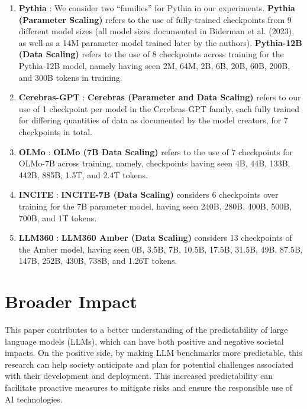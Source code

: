 \begin{enumerate}
    \item \textbf{Pythia} \citep{biderman2023pythia}: We consider two ``families'' for Pythia in our experiments. \textbf{Pythia (Parameter Scaling)} refers to the use of fully-trained checkpoints from 9 different model sizes (all model sizes documented in Biderman et al. (2023), as well as a 14M parameter model trained later by the authors). \textbf{Pythia-12B (Data Scaling)} refers to the use of 8 checkpoints across training for the Pythia-12B model, namely having seen 2M, 64M, 2B, 6B, 20B, 60B, 200B, and 300B tokens in training.
    \item \textbf{Cerebras-GPT} \citep{dey2023cerebrasgpt}: \textbf{Cerebras (Parameter and Data Scaling)} refers to our use of 1 checkpoint per model in the Cerebras-GPT family, each fully trained for differing quantities of data as documented by the model creators, for 7 checkpoints in total. 
    \item \textbf{OLMo} \citep{groeneveld2024olmo}: \textbf{OLMo (7B Data Scaling)} refers to the use of 7 checkpoints for OLMo-7B across training, namely, checkpoints having seen 4B, 44B, 133B, 442B, 885B, 1.5T, and 2.4T tokens.
    \item \textbf{INCITE} \citep{together2023incite}: \textbf{INCITE-7B (Data Scaling)} considers 6 checkpoints over training for the 7B parameter model, having seen 240B, 280B, 400B, 500B, 700B, and 1T tokens.
    \item \textbf{LLM360} \citep{liu2023llm360}: \textbf{LLM360 Amber (Data Scaling)} considers 13 checkpoints of the Amber model, having seen 0B, 3.5B, 7B, 10.5B, 17.5B, 31.5B, 49B, 87.5B, 147B, 252B, 430B, 738B, and 1.26T tokens.
\end{enumerate}


\section{Broader Impact}
This paper contributes to a better understanding of the predictability of large language models (LLMs), which can have both positive and negative societal impacts. 
On the positive side, by making LLM benchmarks more predictable, this research can help society anticipate and plan for potential challenges associated with their development and deployment. This increased predictability can facilitate proactive measures to mitigate risks and ensure the responsible use of AI technologies.

